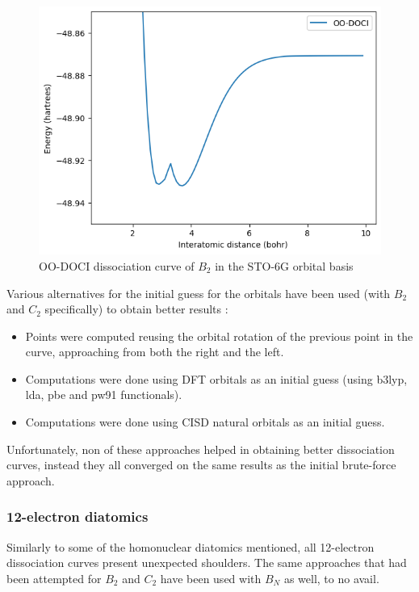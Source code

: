 \documentclass[twoside,twocolumn,9pt]{article}
\begin{document}
\begin{figure}[h]
  \includegraphics[width=\linewidth]{B2.png}
  \caption{OO-DOCI dissociation curve of $B_2$ in the STO-6G orbital basis}\label{B2_bad}
\end{figure}

Various alternatives for the initial guess for the orbitals have been used (with $B_2$ and $C_2$ specifically) to obtain better results :

\begin{itemize}
  \item Points were computed reusing the orbital rotation of the previous point in the curve, approaching from both the right and the left.
  \item Computations were done using DFT orbitals as an initial guess (using b3lyp, lda, pbe and pw91 functionals).
  \item Computations were done using CISD natural orbitals as an initial guess.
\end{itemize}

Unfortunately, non of these approaches helped in obtaining better dissociation curves, instead they all converged on the same results as the initial brute-force approach. 

\subsubsection{12-electron diatomics}

Similarly to some of the homonuclear diatomics mentioned, all 12-electron dissociation curves present unexpected shoulders. The same approaches that had been attempted for $B_2$ and $C_2$ have been used with $B_N$ as well, to no avail.
\end{document}
